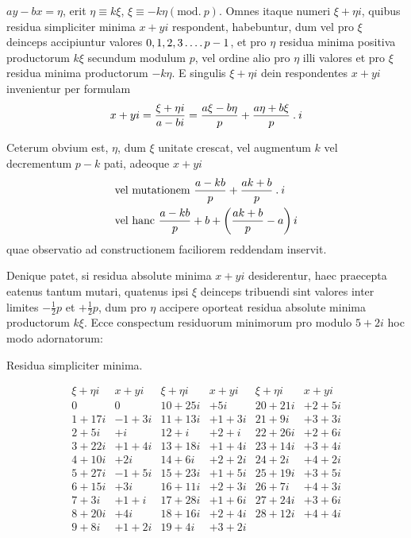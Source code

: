 %
$ay-bx=\eta$, erit $\eta\equiv k\xi$, $\xi\equiv-k\eta(\mathrm{mod.}\ p)$. Omnes itaque numeri $\xi+\eta i$, quibus residua simpliciter minima $x+yi$ respondent, habebuntur, dum vel pro $\xi$ deinceps accipiuntur valores $0,1,2,3\mathinner{.\,.\,.\,.} p-1$, et pro $\eta$ residua minima positiva productorum $k\xi$ secundum modulum $p$, vel ordine alio pro $\eta$ illi valores et pro $\xi$ residua minima productorum $-k\eta$. E singulis $\xi+\eta i$ dein respondentes $x+yi$ invenientur per formulam
\[
x+yi=\frac{\xi+\eta i}{a-bi}=\frac{a\xi-b\eta}{p}+\frac{a\eta+b\xi}{p}\mathbin{.} i
\]

Ceterum obvium est, $\eta$, dum $\xi$ unitate crescat, vel augmentum $k$ vel decrementum $p-k$ pati, adeoque $x+yi$
\[
\begin{aligned}
&\text{vel mutationem }\frac{a-kb}{p}+\frac{ak+b}{p}\mathbin{.} i\\
&\text{vel hanc }\frac{a-kb}{p}+b+\left(\frac{ak+b}{p}-a\right)i
\end{aligned}
\]
quae observatio ad constructionem faciliorem reddendam inservit.

Denique patet, si residua absolute minima $x+yi$ desiderentur, haec praecepta eatenus tantum mutari, quatenus ipsi $\xi$ deinceps tribuendi sint valores inter limites $-\frac12p$ et $+\frac12p$, dum pro $\eta$ accipere oporteat residua absolute minima productorum $k\xi$. Ecce conspectum residuorum minimorum pro modulo $5+2i$ hoc modo adornatorum:

\begin{center}Residua simpliciter minima.\end{center}
{\small\setlength{\arraycolsep}{3pt}
\[
\begin{array}{r|r||r|r||r|r}
\xi+\eta i&x+yi&\xi+\eta i&x+yi&\xi+\eta i&x+yi\\\hline
0&0&10+25i&+5i&20+21i&+2+5i\\
1+17i&-1+3i&11+13i&+1+3i&21+9i&+3+3i\\
2+5i&+i&12+i&+2+i&22+26i&+2+6i\\
3+22i&+1+4i&13+18i&+1+4i&23+14i&+3+4i\\
4+10i&+2i&14+6i&+2+2i&24+2i&+4+2i\\
5+27i&-1+5i&15+23i&+1+5i&25+19i&+3+5i\\
6+15i&+3i&16+11i&+2+3i&26+7i&+4+3i\\
7+3i&+1+i&17+28i&+1+6i&27+24i&+3+6i\\
8+20i&+4i&18+16i&+2+4i&28+12i&+4+4i\\
9+8i&+1+2i&19+4i&+3+2i&&
\end{array}
\]
}

